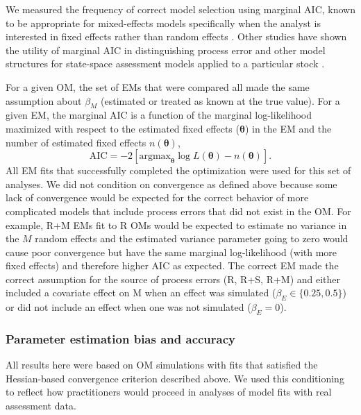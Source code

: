 \documentclass[
  12pt,
]{article}
\begin{document}
We measured the frequency of correct model selection using marginal AIC,
known to be appropriate for mixed-effects models specifically when the
analyst is interested in fixed effects rather than random effects
\citep{vaidablanchard05}. Other studies have shown the utility of
marginal AIC in distinguishing process error and other model structures
for state-space assessment models applied to a particular stock
\citep{millerhyun18, stockmiller21}.

For a given OM, the set of EMs that were compared all made the same
assumption about \(\beta_M\) (estimated or treated as known at the true
value). For a given EM, the marginal AIC is a function of the marginal
log-likelihood maximized with respect to the estimated fixed effects
(\(\boldsymbol{\theta}\)) in the EM and the number of estimated fixed
effects \(n\left(\boldsymbol{\theta}\right)\), \[
\text{AIC} = -2\left[{\text{argmax}}_{\boldsymbol{\theta}} \log L\left({\boldsymbol{\theta}}\right) - n\left({\boldsymbol{\theta}}\right)\right].
\] All EM fits that successfully completed the optimization were used
for this set of analyses. We did not condition on convergence as defined
above because some lack of convergence would be expected for the correct
behavior of more complicated models that include process errors that did
not exist in the OM. For example, R+M EMs fit to R OMs would be expected
to estimate no variance in the \(M\) random effects and the estimated
variance parameter going to zero would cause poor convergence but have
the same marginal log-likelihood (with more fixed effects) and therefore
higher AIC as expected. The correct EM made the correct assumption for
the source of process errors (R, R+S, R+M) and either included a
covariate effect on M when an effect was simulated
(\(\beta_E \in \{0.25,0.5\}\)) or did not include an effect when one was
not simulated (\(\beta_E = 0\)).

\subsubsection*{Parameter estimation bias and
accuracy}\label{parameter-estimation-bias-and-accuracy}

All results here were based on OM simulations with fits that satisfied
the Hessian-based convergence criterion described above. We used this
conditioning to reflect how practitioners would proceed in analyses of
model fits with real assessment data.
\end{document}
